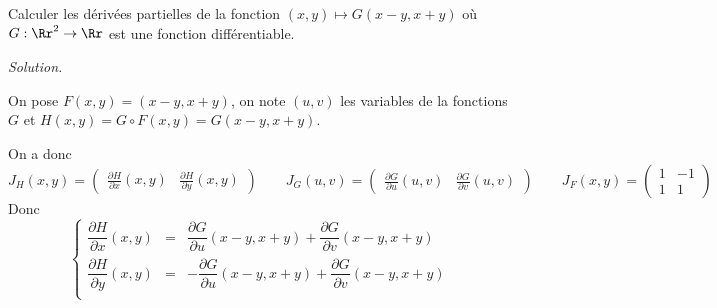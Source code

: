 \documentclass[12pt, class=report,crop=false]{standalone}
\begin{document}
\begin{exemple}
Calculer les dérivées partielles de la fonction $(x,y) \mapsto G(x-y,x+y)$ où 
$G : \Rr^2 \to \Rr$ est une fonction différentiable.

\bigskip
\emph{Solution.}

On pose $F(x,y) = (x-y,x+y)$, on note $(u,v)$ les variables de la fonctions $G$ et $H(x,y) = G \circ F(x,y)
= G(x-y,x+y)$.

On a donc 
$$J_H(x,y) = \begin{pmatrix} \frac{\partial H}{\partial x}(x,y)
&  \frac{\partial H}{\partial y}(x,y) \end{pmatrix} \qquad
J_G(u,v) = \begin{pmatrix} \frac{\partial G}{\partial u}(u,v)
&  \frac{\partial G}{\partial v}(u,v) \end{pmatrix}\qquad
J_F(x,y) = \begin{pmatrix} 
1 &  -1 \\
1 &  1
\end{pmatrix}
$$
Donc 
$$
\left\{\begin{array}{rcl}
\dfrac{\partial H}{\partial x}(x,y) &=& 
\dfrac{\partial G}{\partial u}(x-y,x+y) + \dfrac{\partial G}{\partial v}(x-y,x+y) \\[2ex]
\dfrac{\partial H}{\partial y}(x,y) &=& 
-\dfrac{\partial G}{\partial u}(x-y,x+y) + \dfrac{\partial G}{\partial v}(x-y,x+y) \\
\end{array}\right.
$$
\end{exemple}

\bigskip
{}
\end{document}
